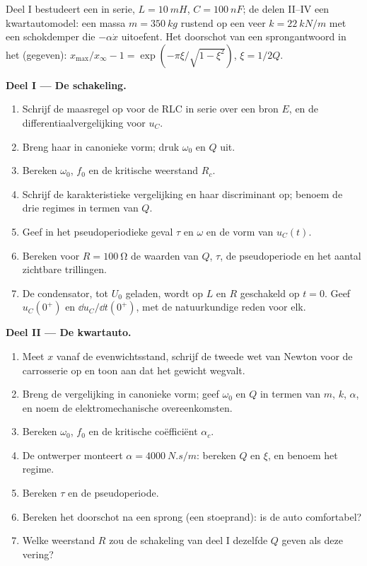\begin{problem}
\label{pb:b1:transient-regimes:1}
Deel I bestudeert een  in serie, $L = \qty{10}{mH}$, $C = \qty{100}{nF}$;
de delen II--IV een kwartautomodel: een massa $m = \qty{350}{kg}$ rustend op een
veer $k = \qty{22}{kN/m}$ met een schokdemper die $-\alpha\dot x$ uitoefent.
Het doorschot van een sprongantwoord in het  (gegeven):
$x_{\max}/x_\infty - 1 = \exp(-\pi\xi/\sqrt{1 - \xi^2})$, $\xi = 1/2Q$.

\medskip
\noindent\textbf{Deel I --- De schakeling.}
\begin{enumerate}
  \item Schrijf de maasregel op voor de RLC in serie over een bron $E$, en
        de differentiaalvergelijking voor $u_C$.
  \item Breng haar in canonieke vorm; druk $\omega_0$ en $Q$ uit.
  \item Bereken $\omega_0$, $f_0$ en de kritische weerstand $R_c$.
  \item Schrijf de karakteristieke vergelijking en haar discriminant op; benoem
        de drie regimes in termen van $Q$.
  \item Geef in het pseudoperiodieke geval $\tau$ en $\omega$ en de
        vorm van $u_C(t)$.
  \item Bereken voor $R = \qty{100}{\ohm}$ de waarden van $Q$, $\tau$, de pseudoperiode
        en het aantal zichtbare trillingen.
  \item De condensator, tot $U_0$ geladen, wordt op $L$ en $R$ geschakeld
        op $t = 0$. Geef $u_C(0^+)$ en $\dd u_C/\dd t(0^+)$, met de
        natuurkundige reden voor elk.
\end{enumerate}

\medskip
\noindent\textbf{Deel II --- De kwartauto.}
\begin{enumerate}[resume]
  \item Meet $x$ vanaf de evenwichtsstand, schrijf de tweede wet van
        Newton voor de carrosserie op en toon aan dat het gewicht wegvalt.
  \item Breng de vergelijking in canonieke vorm; geef $\omega_0$ en $Q$ in
        termen van $m$, $k$, $\alpha$, en noem de elektromechanische
        overeenkomsten.
  \item Bereken $\omega_0$, $f_0$ en de kritische coëfficiënt
        $\alpha_c$.
  \item De ontwerper monteert $\alpha = \qty{4000}{N.s/m}$: bereken $Q$ en
        $\xi$, en benoem het regime.
  \item Bereken $\tau$ en de pseudoperiode.
  \item Bereken het doorschot na een sprong (een stoeprand): is de auto
        comfortabel?
  \item Welke weerstand $R$ zou de schakeling van deel I dezelfde
        $Q$ geven als deze vering?
\end{enumerate}


\end{problem}
